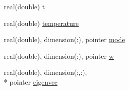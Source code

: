 \begin{DoxyCompactItemize}
\item 
real(double) \hyperlink{structhb__class_1_1hb_aa9a64f5f6e1c6b43e49f4f369cc36122}{t}
\item 
real(double) \hyperlink{structhb__class_1_1hb_a5d5e5ee121dffd96571df21b84b83507}{temperature}
\item 
real(double), dimension(\-:), pointer \hyperlink{structhb__class_1_1hb_ac5b121a046f5ee32acc9830d4a9d0583}{mode}
\item 
real(double), dimension(\-:), pointer \hyperlink{structhb__class_1_1hb_aa5b032073db26bbc82430e5dcefa77a6}{w}
\item 
real(double), dimension(\-:,\-:), \\*
pointer \hyperlink{structhb__class_1_1hb_ac62b62b36a6c37ba8477efc35c6f97bf}{eigenvec}
\end{DoxyCompactItemize}


